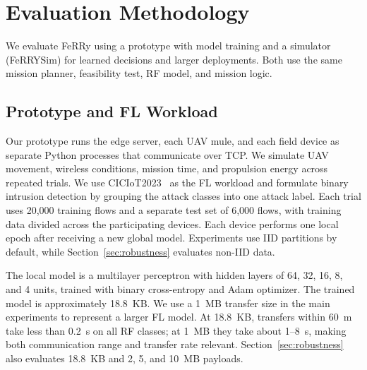 \documentclass[conference]{IEEEtran}
\newcommand{\sysname}{FeRRy}
\begin{document}
\section{Evaluation Methodology}
\label{sec:evaluation}
We evaluate \sysname{} using a prototype with model training and a simulator (FeRRYSim)
for learned decisions and larger deployments. Both use the same mission planner, feasibility test, RF model, and mission logic.

\subsection{Prototype and FL Workload}
\label{sec:prototype}


Our prototype runs the edge server, each UAV mule, and each field device as
separate Python processes that communicate over TCP. We simulate UAV movement, wireless conditions, mission time, and propulsion energy across repeated trials. We use CICIoT2023~\cite{CiCIoT2023} as the FL workload and formulate binary
intrusion detection by grouping the attack classes into one attack label. Each
trial uses 20,000 training flows and a separate test set of 6,000 flows, with
training data divided across the participating devices. Each device
performs one local epoch after receiving a new global model. Experiments use IID partitions by default, while Section~\ref{sec:robustness} evaluates non-IID data.

The local model is a multilayer perceptron with hidden layers of 64, 32, 16, 8,
and 4 units, trained with binary cross-entropy and Adam optimizer. The trained model is
approximately 18.8~KB. We use a 1~MB transfer size in the main experiments to
represent a larger FL model. At 18.8~KB, transfers within 60~m take less than
0.2~s on all RF classes; at 1~MB they take about 1--8~s, making both communication range and
transfer rate relevant. Section~\ref{sec:robustness} also evaluates 18.8~KB and 2, 5,
and 10~MB payloads.
\end{document}
